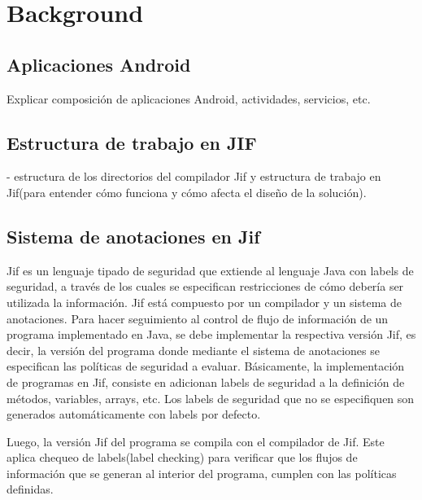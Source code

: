 \section{Background}
\label{sec:back}

\subsection{Aplicaciones Android}
Explicar composición de aplicaciones Android, actividades, servicios, etc.

\subsection{Estructura de trabajo en JIF}
- estructura de los directorios del compilador Jif y estructura de trabajo en
Jif(para entender cómo funciona y cómo afecta el diseño de la
solución).

\subsection{Sistema de anotaciones en Jif}
Jif es un lenguaje tipado de seguridad que extiende al lenguaje Java con labels
de seguridad, a través de los cuales se especifican restricciones de cómo
debería ser utilizada la información.\newline 
Jif está compuesto por un compilador y un sistema de anotaciones.\newline
Para hacer seguimiento al control de flujo de información de un programa
implementado en Java, se debe implementar la respectiva versión Jif, es decir,
la versión del programa donde mediante el sistema de anotaciones se especifican
las políticas de seguridad a evaluar.\newline
Básicamente, la implementación de programas en Jif, consiste en adicionan labels
de seguridad a la definición de métodos, variables, arrays, etc. Los labels de
seguridad que no se especifiquen son generados automáticamente con labels por
defecto.

Luego, la versión Jif del programa se compila con el compilador de Jif.
Este aplica chequeo de labels(label checking)\cite{jifRef} para verificar que
los flujos de información que se generan al interior del programa, cumplen con
las políticas definidas.

